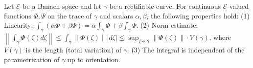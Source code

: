 Let $\mathcal{E}$ be a Banach space and let $\gamma$ be a rectifiable curve. For continuous $\mathcal{E}$-valued functions $\Phi, \Psi$ on the trace of $\gamma$ and scalars $\alpha, \beta$, the following properties hold:
(1) Linearity: $\int_{\gamma} (\alpha \Phi + \beta \Psi) = \alpha \int_{\gamma} \Phi + \beta \int_{\gamma} \Psi$.
(2) Norm estimate: $\left\| \int_{\gamma} \Phi(\zeta) d\zeta \right\| \leq \int_{\gamma} \|\Phi(\zeta)\| |d\zeta| \leq \sup_{\zeta \in \gamma} \|\Phi(\zeta)\| \cdot V(\gamma)$,
where $V(\gamma)$ is the length (total variation) of $\gamma$.
(3) The integral is independent of the parametrization of $\gamma$ up to orientation.
